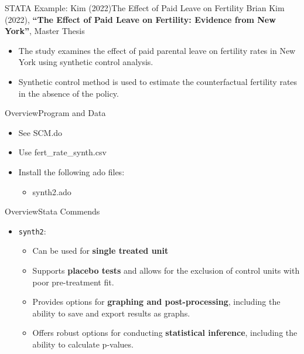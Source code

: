 \documentclass[dvipsnames,hyperref={pdfpagelabels=false}]{beamer}
\begin{document}
\begin{frame}{STATA Example: Kim (2022)}{The Effect of Paid Leave on Fertility}
Brian Kim (2022), \textbf{``The Effect of Paid Leave on Fertility: Evidence from New York''}, Master Thesis
\begin{itemize}
	\vspace{0.2cm}
	\item The study examines the effect of paid parental leave on fertility rates in New York using synthetic control analysis.
	\vspace{0.2cm}
	\item Synthetic control method is used to estimate the counterfactual fertility rates in the absence of the policy.
\end{itemize}
\end{frame}




\begin{frame}{Overview}{Program and Data}
	\begin{itemize}
		\item See SCM.do
		\vspace{0.2cm}
		\item Use fert\_rate\_synth.csv
		\vspace{0.2cm}
		\item Install the following ado files:
		\begin{itemize}
			\vspace{0.2cm}
			\item synth2.ado 
		
			
		\end{itemize}
		
	\end{itemize}
\end{frame}





\begin{frame}[fragile]{Overview}{Stata Commends}
\begin{itemize}

	\item \texttt{synth2}:
	\vspace{0.2cm}
	\begin{itemize}
		\item Can be used for \textbf{single treated unit}
		\vspace{0.2cm}
		\item Supports \textbf{placebo tests} and allows for the exclusion of control units with poor pre-treatment fit.
		\vspace{0.2cm}
		\item Provides options for \textbf{graphing and post-processing}, including the ability to save and export results as graphs.
		\vspace{0.2cm}
		\item Offers robust options for conducting \textbf{statistical inference}, including the ability to calculate p-values.
	\end{itemize}
\end{itemize}
\end{frame}
\end{document}
